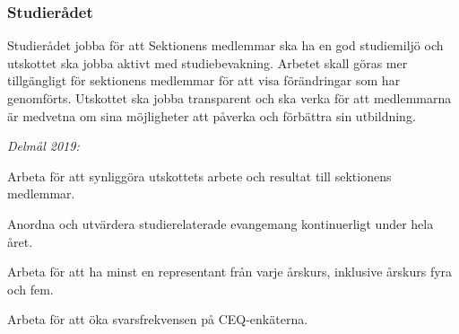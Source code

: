 \documentclass[../_main/handlingar.tex]{subfiles}
\begin{document}
\subsubsection*{Studierådet}
Studierådet jobba för att Sektionens medlemmar ska ha en god studiemiljö och utskottet ska jobba aktivt med studiebevakning. Arbetet skall göras mer tillgängligt för sektionens medlemmar för att visa förändringar som har genomförts. Utskottet ska jobba transparent och ska verka för att medlemmarna är medvetna om sina möjligheter att påverka och förbättra sin utbildning. 

\emph{Delmål 2019:}
\begin{dashlist}
    \item Arbeta för att synliggöra utskottets arbete och resultat till sektionens medlemmar. 
    \item Anordna och utvärdera studierelaterade evangemang kontinuerligt under hela året.
    \item Arbeta för att ha minst en representant från varje årskurs, inklusive årskurs fyra och fem. 
    \item Arbeta för att öka svarsfrekvensen på CEQ-enkäterna.        
\end{dashlist}

\newpage
\end{document}
